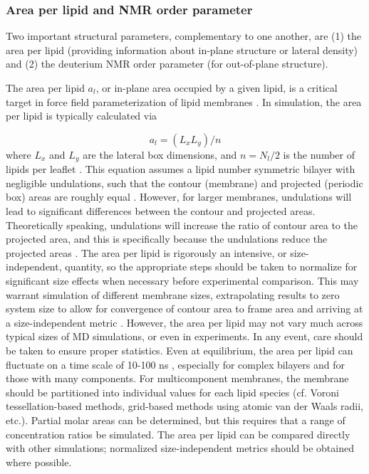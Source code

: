 \documentclass[9pt,bestpractices]{livecoms}
\begin{document}
\subsubsection{Area per lipid and NMR order parameter}
\label{subsubsec:aplnmr}
Two important structural parameters, complementary to one another, are (1) the area per lipid (providing information about in-plane structure or lateral density) and (2) the deuterium NMR order parameter (for out-of-plane structure).

The area per lipid $a_l$, or in-plane area occupied by a given lipid, is a critical target in force field parameterization of lipid membranes \cite{Venable2015,Klauda2010d}.
In simulation, the area per lipid is typically calculated via

\begin{equation}\label{eq:5}
	a_l=(L_x L_y)/n
\end{equation}
where $L_x$ and $L_y$ are the lateral box dimensions, and $n=N_l/2$ is the number of lipids per leaflet \cite{Poger2016}.
This equation assumes a lipid number symmetric bilayer with negligible undulations, such that the contour (membrane) and projected (periodic box) areas are roughly equal \cite{Venable2015,Klauda2010d}.
However, for larger membranes, undulations will lead to significant differences between the contour and projected areas.
Theoretically speaking, undulations will increase the ratio of contour area to the projected area, and this is specifically because the undulations reduce the projected areas \cite{Venable2015}.
The area per lipid is rigorously an intensive, or size-independent, quantity, so the appropriate steps should be taken to normalize for significant size effects when necessary before experimental comparison.
This may warrant simulation of different membrane sizes, extrapolating results to zero system size to allow for convergence of contour area to frame area and arriving at a size-independent metric \cite{Waheed2009}.
However, the area per lipid may not vary much across typical sizes of MD simulations, or even in experiments.
In any event, care should be taken to ensure proper statistics.
Even at equilibrium, the area per lipid can fluctuate on a time scale of 10-100 ns \cite{Poger2016}, especially for complex bilayers and for those with many components.
For multicomponent membranes, the membrane should be partitioned into individual values for each lipid species (cf. Voroni tessellation-based methods, grid-based methods using atomic van der Waals radii, etc.).
Partial molar areas can be determined, but this requires that a range of concentration ratios be simulated.
The area per lipid can be compared directly with other simulations; normalized size-independent metrics should be obtained where possible.
\end{document}

